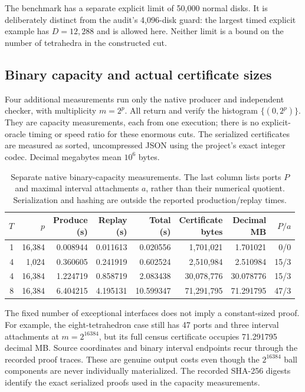 The benchmark has a separate explicit limit of 50,000 normal disks.  It is
deliberately distinct from the audit's 4,096-disk guard: the largest timed
explicit example has $D=12,288$ and is allowed here.  Neither limit is a
bound on the number of tetrahedra in the constructed cut.

\subsection{Binary capacity and actual certificate sizes}
\label{main:exp-capacity}

Four additional measurements run only the native producer and independent
checker, with multiplicity $m=2^p$.  All return and verify the histogram
$\{(0,2^p)\}$.  They are capacity measurements, each from one execution;
there is no explicit-oracle timing or speed ratio for these enormous cuts.
The serialized certificates are measured as sorted, uncompressed JSON using
the project's exact integer codec.  Decimal megabytes mean $10^6$ bytes.

\begin{table}[htbp]
\centering
\small
\setlength{\tabcolsep}{3.2pt}
\begin{tabular}{@{}rrrrrrrr@{}}
\toprule
$T$ & $p$ &
\shortstack{Produce\\(s)} &
\shortstack{Replay\\(s)} &
\shortstack{Total\\(s)} &
\shortstack{Certificate\\bytes} &
\shortstack{Decimal\\MB} & $P/a$ \\
\midrule
1 & 16,384 & 0.008944 & 0.011613 & 0.020556 &
1,701,021 & 1.701021 & 0/0 \\
4 & 1,024 & 0.360605 & 0.241919 & 0.602524 &
2,510,984 & 2.510984 & 15/3 \\
4 & 16,384 & 1.224719 & 0.858719 & 2.083438 &
30,078,776 & 30.078776 & 15/3 \\
8 & 16,384 & 6.404215 & 4.195131 & 10.599347 &
71,291,795 & 71.291795 & 47/3 \\
\bottomrule
\end{tabular}
\caption{Separate native binary-capacity measurements.  The last column
lists ports $P$ and maximal interval attachments $a$, rather than their
numerical quotient.  Serialization and hashing are outside the reported
production/replay times.}
\label{main:exp-capacity-table}
\end{table}

The fixed number of exceptional interfaces does not imply a constant-sized
proof.  For example, the eight-tetrahedron case still has 47 ports and three
interval attachments at $m=2^{16384}$, but its full census certificate occupies
71.291795 decimal MB.  Source coordinates and binary interval endpoints recur
through the recorded proof traces.  These are genuine output costs even
though the $2^{16384}$ ball components are never individually materialized.
The recorded SHA-256 digests identify the exact serialized proofs used in
the capacity measurements.

